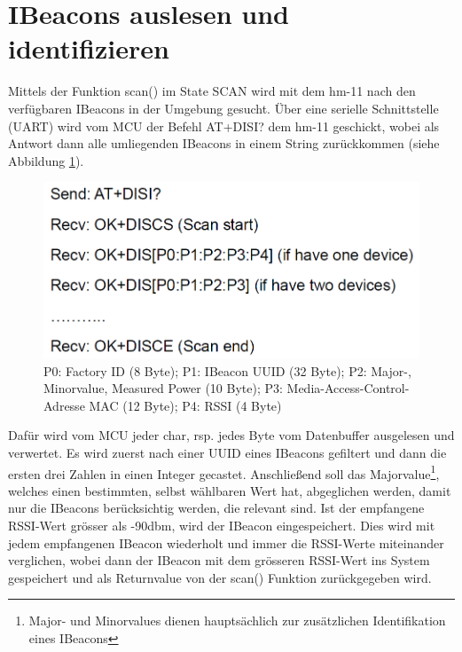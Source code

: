 \section{IBeacons auslesen und identifizieren}
Mittels der Funktion scan() im State SCAN wird mit dem hm-11 nach den verfügbaren IBeacons in der Umgebung gesucht. Über eine serielle Schnittstelle (UART) wird vom MCU der Befehl AT+DISI? dem hm-11 geschickt, wobei als Antwort dann alle umliegenden IBeacons in einem String zurückkommen (siehe Abbildung \ref{fig:disiCommand}).\\
\begin{figure}[h]
\centering
\includegraphics[scale=0.7]{Bilder/disi_command.PNG} 
\caption[Rückgabe des AT+DISI? Befehls]{P0: Factory ID (8 Byte); P1: IBeacon UUID (32 Byte); P2: Major-, Minorvalue, Measured Power (10 Byte); P3: Media-Access-Control-Adresse MAC (12 Byte); P4: RSSI (4 Byte) \cite{hm11Datasheet}}
\label{fig:disiCommand}
\end{figure}
Dafür wird vom MCU jeder char, rsp. jedes Byte vom Datenbuffer ausgelesen und verwertet. Es wird zuerst nach einer UUID eines IBeacons gefiltert und dann die ersten drei Zahlen in einen Integer gecastet. Anschließend soll das Majorvalue\footnote{Major- und Minorvalues dienen hauptsächlich zur zusätzlichen Identifikation eines IBeacons}, welches einen bestimmten, selbst wählbaren Wert hat, abgeglichen werden, damit nur die IBeacons berücksichtig werden, die relevant sind. Ist der empfangene RSSI-Wert grösser als -90dbm, wird der IBeacon eingespeichert. Dies wird mit jedem empfangenen IBeacon wiederholt und immer die RSSI-Werte miteinander verglichen, wobei dann der IBeacon mit dem grösseren RSSI-Wert ins System gespeichert und als Returnvalue von der scan() Funktion zurückgegeben wird.

